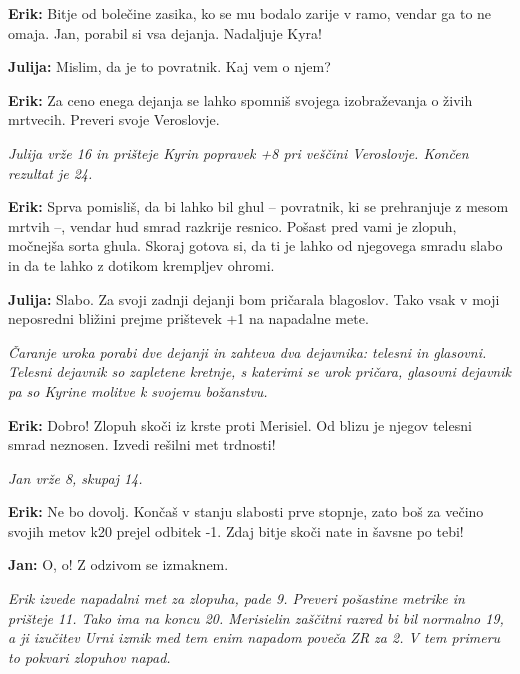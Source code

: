 \textbf{Erik:} Bitje od bolečine zasika, ko se mu bodalo zarije v ramo, vendar ga to ne omaja. Jan, porabil si vsa dejanja. Nadaljuje Kyra!

\textbf{Julija:} Mislim, da je to povratnik. Kaj vem o njem?

\textbf{Erik:} Za ceno enega dejanja se lahko spomniš svojega izobraževanja o živih mrtvecih. Preveri svoje Veroslovje.

\vspace{20pt}
\textit{Julija vrže 16 in prišteje Kyrin popravek +8 pri veščini Veroslovje. Končen rezultat je 24.}
\vspace{20pt}

\textbf{Erik:} Sprva pomisliš, da bi lahko bil ghul -- povratnik, ki se prehranjuje z mesom mrtvih --, vendar hud smrad razkrije resnico. Pošast pred vami je zlopuh, močnejša sorta ghula. Skoraj gotova si, da ti je lahko od njegovega smradu slabo in da te lahko z dotikom krempljev ohromi.

\textbf{Julija:} Slabo. Za svoji zadnji dejanji bom pričarala blagoslov. Tako vsak v moji neposredni bližini prejme prištevek +1 na napadalne mete.

\vspace{20pt}
\textit{Čaranje uroka porabi dve dejanji in zahteva dva dejavnika: telesni in glasovni. Telesni dejavnik so zapletene kretnje, s katerimi se urok pričara, glasovni dejavnik pa so Kyrine molitve k svojemu božanstvu.}
\vspace{20pt}

\textbf{Erik:} Dobro! Zlopuh skoči iz krste proti Merisiel. Od blizu je njegov telesni smrad neznosen. Izvedi rešilni met trdnosti!

\vspace{20pt}
\textit{Jan vrže 8, skupaj 14.}
\vspace{20pt}

\textbf{Erik:} Ne bo dovolj. Končaš v stanju slabosti prve stopnje, zato boš za večino svojih metov k20 prejel odbitek -1. Zdaj bitje skoči nate in šavsne po tebi!

\textbf{Jan:} O, o! Z odzivom se izmaknem.

\vspace{20pt}
\textit{Erik izvede napadalni met za zlopuha, pade 9. Preveri pošastine metrike in prišteje 11. Tako ima na koncu 20. Merisielin zaščitni razred bi bil normalno 19, a ji izučitev Urni izmik med tem enim napadom poveča ZR za 2. V tem primeru to pokvari zlopuhov napad.}
\vspace{20pt}

